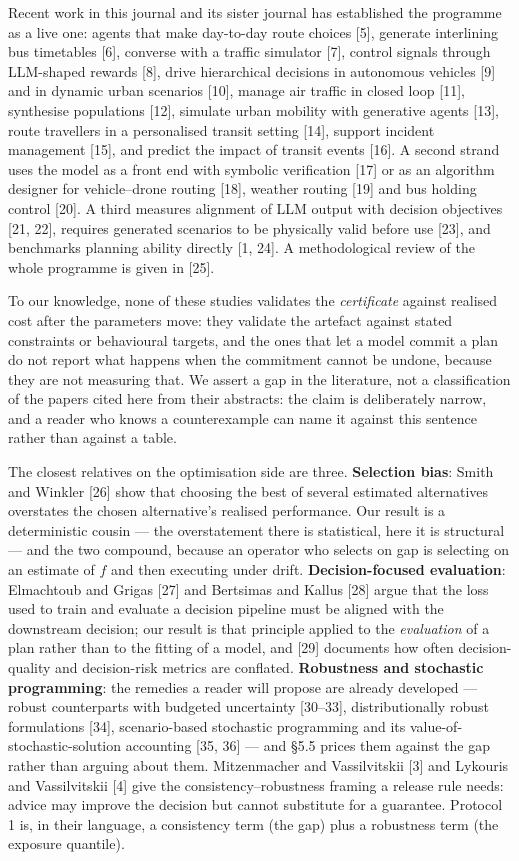 \documentclass[preprint,12pt,letterpaper]{elsarticle}
\theoremstyle{definition}
\theoremstyle{plain}
\begin{document}
Recent work in this journal and its sister journal has established the programme as a live one: agents that make day-to-day route choices [5], generate interlining bus timetables [6], converse with a traffic simulator [7], control signals through LLM-shaped rewards [8], drive hierarchical decisions in autonomous vehicles [9] and in dynamic urban scenarios [10], manage air traffic in closed loop [11], synthesise populations [12], simulate urban mobility with generative agents [13], route travellers in a personalised transit setting [14], support incident management [15], and predict the impact of transit events [16]. A second strand uses the model as a front end with symbolic verification [17] or as an algorithm designer for vehicle--drone routing [18], weather routing [19] and bus holding control [20]. A third measures alignment of LLM output with decision objectives [21, 22], requires generated scenarios to be physically valid before use [23], and benchmarks planning ability directly [1, 24]. A methodological review of the whole programme is given in [25].

To our knowledge, none of these studies validates the \textit{certificate} against realised cost after the parameters move: they validate the artefact against stated constraints or behavioural targets, and the ones that let a model commit a plan do not report what happens when the commitment cannot be undone, because they are not measuring that. We assert a gap in the literature, not a classification of the papers cited here from their abstracts: the claim is deliberately narrow, and a reader who knows a counterexample can name it against this sentence rather than against a table.

The closest relatives on the optimisation side are three. \textbf{Selection bias}: Smith and Winkler [26] show that choosing the best of several estimated alternatives overstates the chosen alternative's realised performance. Our result is a deterministic cousin --- the overstatement there is statistical, here it is structural --- and the two compound, because an operator who selects on gap is selecting on an estimate of $f$ and then executing under drift. \textbf{Decision-focused evaluation}: Elmachtoub and Grigas [27] and Bertsimas and Kallus [28] argue that the loss used to train and evaluate a decision pipeline must be aligned with the downstream decision; our result is that principle applied to the \textit{evaluation} of a plan rather than to the fitting of a model, and [29] documents how often decision-quality and decision-risk metrics are conflated. \textbf{Robustness and stochastic programming}: the remedies a reader will propose are already developed --- robust counterparts with budgeted uncertainty [30--33], distributionally robust formulations [34], scenario-based stochastic programming and its value-of-stochastic-solution accounting [35, 36] --- and \S 5.5 prices them against the gap rather than arguing about them. Mitzenmacher and Vassilvitskii [3] and Lykouris and Vassilvitskii [4] give the consistency--robustness framing a release rule needs: advice may improve the decision but cannot substitute for a guarantee. Protocol 1 is, in their language, a consistency term (the gap) plus a robustness term (the exposure quantile).
\end{document}
